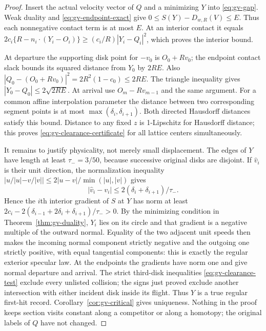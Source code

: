 \begin{proof}
Insert the actual velocity vector of $Q$ and a minimizing $Y$ into
\eqref{eq:gv-gap}. Weak duality and \eqref{eq:gv-endpoint-exact} give
$0\le S(Y)-D_{w,R}(V)\le E$. Thus each nonnegative contact term is
at most $E$. At an interior contact it equals
$2c_i\{R-n_i\cdot(Y_i-O_i)\}\ge(c_i/R)|Y_i-Q_i|^2$,
which proves the interior bound.

At departure the supporting disk point for $-v_0$ is $O_0+Rv_0$;
the endpoint contact slack bounds its squared distance from $Y_0$
by $2RE$. Also
$|Q_0-(O_0+Rv_0)|^2=2R^2(1-c_0)\le2RE$.
The triangle inequality gives $|Y_0-Q_0|\le2\sqrt{2RE}$.
At arrival use $O_m-Rv_{m-1}$ and the same argument.
For a common affine interpolation parameter the distance between two
corresponding segment points is at most
$\max(\delta_i,\delta_{i+1})$. Both directed Hausdorff distances
satisfy this bound. Distance to any fixed $z$ is 1-Lipschitz for
Hausdorff distance; this proves \eqref{eq:gv-clearance-certificate}
for all lattice centers simultaneously.

It remains to justify physicality, not merely small displacement.
The edges of $Y$ have length at least $\tau_-=3/50$, because
successive original disks are disjoint. If $\widehat v_i$ is their
unit direction, the normalization inequality
$|u/|u|-v/|v||\le2|u-v|/\min(|u|,|v|)$ gives
\[
 |\widehat v_i-v_i|\le2(\delta_i+\delta_{i+1})/\tau_-.
\]
Hence the $i$th interior gradient of $S$ at $Y$ has norm at least
$2c_i-2(\delta_{i-1}+2\delta_i+\delta_{i+1})/\tau_->0$.
By the minimizing condition in Theorem~\ref{thm:gv-duality}, $Y_i$
lies on its circle and that gradient is a negative multiple of the
outward normal. Equality of the two adjacent unit speeds then makes
the incoming normal component strictly negative and the outgoing one
strictly positive, with equal tangential components: this is exactly
the regular exterior specular law. At the endpoints the gradients
have norm one and give normal departure and arrival. The strict
third-disk inequalities \eqref{eq:gv-clearance-test} exclude every
unlisted collision; the signs just proved exclude another intersection
with either incident disk inside its flight. Thus $Y$ is a true regular
first-hit record. Corollary~\ref{cor:gv-critical} gives uniqueness.
Nothing in the proof keeps section visits constant along a competitor
or along a homotopy; the original labels of $Q$ have not changed.
\end{proof}

